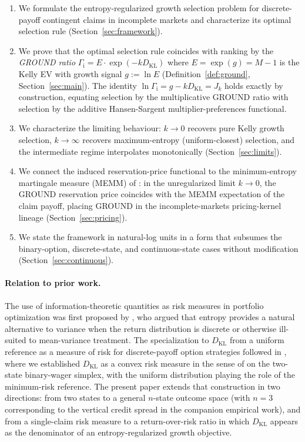 \documentclass[11pt]{article}
\theoremstyle{definition}
\theoremstyle{remark}
\newcommand{\KL}{D_{\mathrm{KL}}}
\newcommand{\GROUND}{\Gamma_{\mathrm{i}}}
\begin{document}
\begin{enumerate}
    \item We formulate the entropy-regularized growth selection problem
          for discrete-payoff contingent claims in incomplete markets
          and characterize its optimal selection rule
          (Section~\ref{sec:framework}).
    \item We prove that the optimal selection rule coincides with
          ranking by the \emph{GROUND ratio} $\GROUND = E \cdot \exp(-k \KL)$
          where $E = \exp(g) = M - 1$ is the Kelly EV with growth signal
          $g := \ln E$ (Definition~\ref{def:ground},
          Section~\ref{sec:main}). The identity $\ln \GROUND = g - k\KL
          = J_k$ holds exactly by construction, equating selection by the
          multiplicative GROUND ratio with selection by the additive
          Hansen-Sargent multiplier-preferences functional.
    \item We characterize the limiting behaviour: $k \to 0$ recovers
          pure Kelly growth selection, $k \to \infty$ recovers
          maximum-entropy (uniform-closest) selection, and the
          intermediate regime interpolates monotonically
          (Section~\ref{sec:limits}).
    \item We connect the induced reservation-price functional to the
          minimum-entropy martingale measure (MEMM) of
          \citet{frittelli2000}: in the unregularized limit $k \to 0$,
          the GROUND reservation price coincides with the MEMM
          expectation of the claim payoff, placing GROUND in the
          incomplete-markets pricing-kernel lineage
          (Section~\ref{sec:pricing}).
    \item We state the framework in natural-log units in a form that
          subsumes the binary-option, discrete-state, and
          continuous-state cases without modification
          (Section~\ref{sec:continuous}).
\end{enumerate}

\paragraph{Relation to prior work.}
The use of information-theoretic quantities as risk measures in
portfolio optimization was first proposed by
\citet{mercurio2020portfolio}, who argued that entropy provides a
natural alternative to variance when the return distribution is
discrete or otherwise ill-suited to mean-variance treatment. The
specialization to $\KL$ from a uniform reference as a measure of risk
for discrete-payoff option strategies followed in
\citet{mercurio2020binary}, where we established $\KL$ as a convex
risk measure in the sense of \citet{follmer2002} on the two-state
binary-wager simplex, with the uniform distribution playing the role
of the minimum-risk reference. The present paper
extends that construction in two directions: from two states to a
general $n$-state outcome space (with $n = 3$ corresponding to the
vertical credit spread in the companion empirical work), and from a
single-claim risk measure to a return-over-risk ratio in which $\KL$
appears as the denominator of an entropy-regularized growth
objective.
\end{document}
